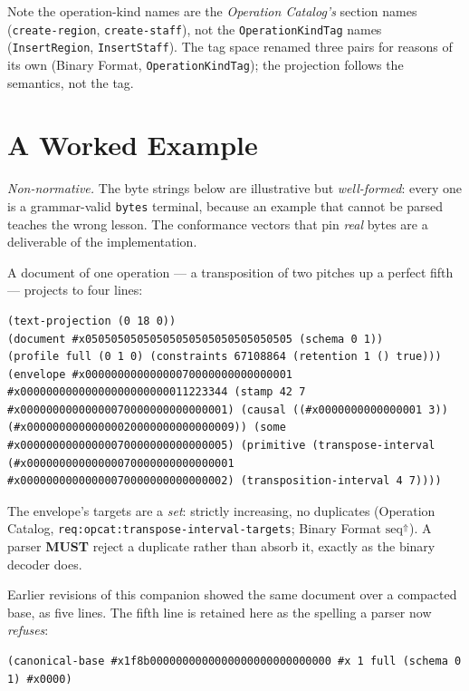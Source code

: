 \documentclass[11pt,letterpaper]{report}
\newcommand{\sectionsc}[1]{{\addfontfeatures{Letters=SmallCaps}#1}}
\newcommand{\MUST}{\textbf{MUST}}
\begin{document}
Note the operation-kind names are the \emph{Operation Catalog's} section names
(\texttt{create-region}, \texttt{create-staff}), not the \texttt{OperationKindTag}
names (\texttt{InsertRegion}, \texttt{InsertStaff}). The tag space renamed three
pairs for reasons of its own (Binary Format,
\sectionsc{\texttt{OperationKindTag}}); the projection follows the semantics, not
the tag.

\chapter{A Worked Example}
\label{ch:example}

\emph{Non-normative.} The byte strings below are illustrative but
\emph{well-formed}: every one is a grammar-valid \texttt{bytes} terminal, because
an example that cannot be parsed teaches the wrong lesson. The conformance vectors
that pin \emph{real} bytes are a deliverable of the implementation.

A document of one operation --- a transposition of two pitches up a perfect
fifth --- projects to four lines:

\begin{lstlisting}
(text-projection (0 18 0))
(document #x05050505050505050505050505050505 (schema 0 1))
(profile full (0 1 0) (constraints 67108864 (retention 1 () true)))
(envelope #x00000000000000070000000000000001 #x00000000000000000000000011223344 (stamp 42 7 #x00000000000000070000000000000001) (causal ((#x0000000000000001 3)) (#x00000000000000020000000000000009)) (some #x00000000000000070000000000000005) (primitive (transpose-interval (#x00000000000000070000000000000001 #x00000000000000070000000000000002) (transposition-interval 4 7))))
\end{lstlisting}

The envelope's targets are a \emph{set}: strictly increasing, no duplicates
(Operation Catalog, \texttt{req:opcat:transpose-interval-targets}; Binary Format
$\mathrm{seq}^{\Uparrow}$). A parser \MUST{} reject a duplicate rather than
absorb it, exactly as the binary decoder does.

Earlier revisions of this companion showed the same document over a compacted
base, as five lines. The fifth line is retained here as the spelling a parser
now \emph{refuses}:

\begin{lstlisting}
(canonical-base #x1f8b0000000000000000000000000000 #x 1 full (schema 0 1) #x0000)
\end{lstlisting}
\end{document}
